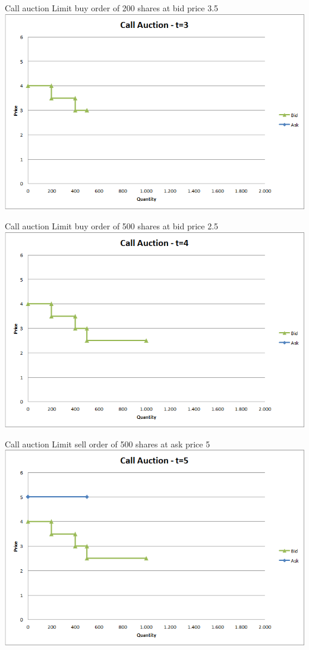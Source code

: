 \documentclass[english,10pt
,aspectratio=169
]{beamer}
\begin{document}
\begin{frame}{Call auction}
	Limit buy order of 200 shares at bid price 3.5
	\quad
	\center
	\includegraphics[width=.75\linewidth]{pics/ch1/Call_t3}
\end{frame}


\begin{frame}{Call auction}
	Limit buy order of 500 shares at bid price 2.5
	\quad
	\center
	\includegraphics[width=.75\linewidth]{pics/ch1/Call_t4}
\end{frame}


\begin{frame}{Call auction}
	Limit sell order of 500 shares at ask price 5
	\quad
	\center
	\includegraphics[width=.75\linewidth]{pics/ch1/Call_t5}
\end{frame}
\end{document}
